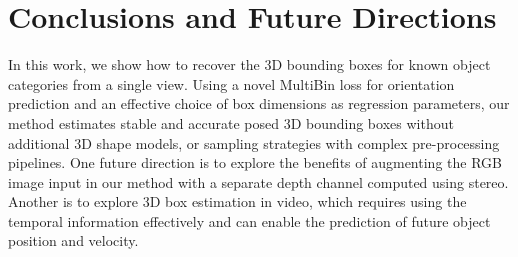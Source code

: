 \documentclass[10pt,twocolumn,letterpaper]{article}
\begin{document}
\section{Conclusions and Future Directions}
In this work, we show how to recover the 3D bounding boxes for known object categories from a single view. Using a novel MultiBin loss for orientation prediction and an effective choice 
of box dimensions as regression parameters, our method estimates stable and accurate posed 3D bounding boxes without additional 3D shape models, or sampling strategies with complex pre-processing pipelines. One future direction is to explore the benefits of augmenting the RGB image input in our method with a separate depth channel computed using stereo.  Another is to explore 3D box estimation in video, which requires using the temporal information effectively and can enable the prediction of future object position and velocity. 


{\small

\balance
}
\end{document}
